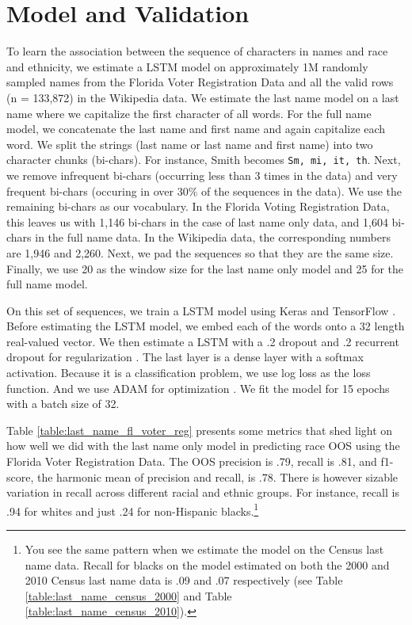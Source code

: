 \documentclass[12pt, letterpaper]{article}
\begin{document}
\section*{Model and Validation}
To learn the association between the sequence of characters in names and race and ethnicity, we estimate a LSTM model \citep{graves2005framewise, gers1999learning} on approximately 1M randomly sampled names from the Florida Voter Registration Data and all the valid rows (n = 133,872) in the Wikipedia data. We estimate the last name model on a last name where we capitalize the first character of all words. For the full name model, we concatenate the last name and first name and again capitalize each word. We split the strings (last name or last name and first name) into two character chunks (bi-chars). For instance, Smith becomes {\tt Sm, mi, it, th}. Next, we remove infrequent bi-chars (occurring less than 3 times in the data) and very frequent bi-chars (occuring in over 30\% of the sequences in the data). We use the remaining bi-chars as our vocabulary. In the Florida Voting Registration Data, this leaves us with 1,146 bi-chars in the case of last name only data, and 1,604 bi-chars in the full name data. In the Wikipedia data, the corresponding numbers are 1,946 and 2,260. Next, we pad the sequences so that they are the same size. Finally, we use 20 as the window size for the last name only model and 25 for the full name model. 

On this set of sequences, we train a LSTM model using Keras \citep{chollet2015keras} and TensorFlow \citep{abadi2016tensorflow}. Before estimating the LSTM model, we embed each of the words onto a 32 length real-valued vector. We then estimate a LSTM with a .2 dropout and .2 recurrent dropout for regularization \citep{srivastava2014dropout}. The last layer is a dense layer with a softmax activation. Because it is a classification problem, we use log loss as the loss function. And we use ADAM for optimization \citep{kingma2014adam}. We fit the model for 15 epochs with a batch size of 32.

Table \ref{table:last_name_fl_voter_reg} presents some metrics that shed light on how well we did with the last name only model in predicting race OOS using the Florida Voter Registration Data. The OOS precision is .79, recall is .81, and f1-score, the harmonic mean of precision and recall, is .78. There is however sizable variation in recall across different racial and ethnic groups. For instance, recall is .94 for whites and just .24 for non-Hispanic blacks.\footnote{You see the same pattern when we estimate the model on the Census last name data. Recall for blacks on the model estimated on both the 2000 and 2010 Census last name data is .09 and .07 respectively (see Table \ref{table:last_name_census_2000} and Table \ref{table:last_name_census_2010}).}
\end{document}

